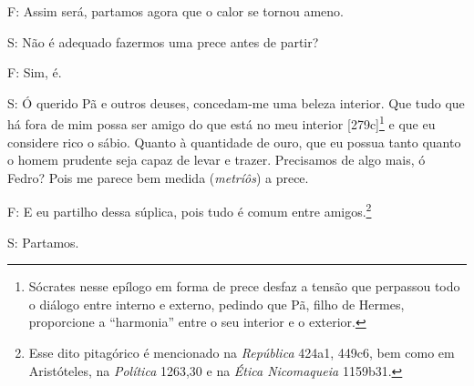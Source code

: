 F: Assim será, partamos agora que o calor se tornou ameno.

S: Não é adequado fazermos uma prece antes de partir?

F: Sim, é.

S: Ó querido Pã e outros deuses, concedam-me uma beleza interior. Que
tudo que há fora de mim possa ser amigo do que está no meu interior
{[}279c{]}\footnote{Sócrates nesse epílogo em forma de prece desfaz a
  tensão que perpassou todo o diálogo entre interno e externo, pedindo
  que Pã, filho de Hermes, proporcione a ``harmonia'' entre o seu
  interior e o exterior.} e que eu considere rico o sábio. Quanto à
quantidade de ouro, que eu possua tanto quanto o homem prudente seja
capaz de levar e trazer. Precisamos de algo mais, ó Fedro? Pois me
parece bem medida (\emph{metríôs}) a prece.

F: E eu partilho dessa súplica, pois tudo é comum entre
amigos.\footnote{Esse dito pitagórico é mencionado na \emph{República}
  424a1, 449c6, bem como em Aristóteles, na \emph{Política} 1263,30 e na
  \emph{Ética Nicomaqueia} 1159b31.}

S: Partamos.
